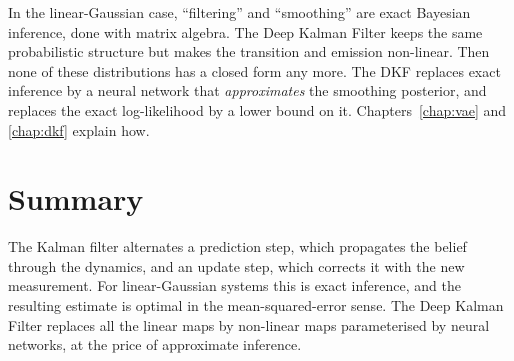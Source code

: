 \begin{inwords}
In the linear-Gaussian case, \enquote{filtering} and \enquote{smoothing}
are exact Bayesian inference, done with matrix algebra. The Deep Kalman
Filter keeps the same probabilistic structure but makes the transition
and emission non-linear. Then none of these distributions has a closed
form any more. The DKF replaces exact inference by a neural network that
\emph{approximates} the smoothing posterior, and replaces the exact
log-likelihood by a lower bound on it. Chapters~\ref{chap:vae} and
\ref{chap:dkf} explain how.
\end{inwords}

\section{Summary}

The Kalman filter alternates a prediction step, which propagates the
belief through the dynamics, and an update step, which corrects it with
the new measurement. For linear-Gaussian systems this is exact inference,
and the resulting estimate is optimal in the mean-squared-error sense.
The Deep Kalman Filter replaces all the linear maps by non-linear maps
parameterised by neural networks, at the price of approximate inference.
